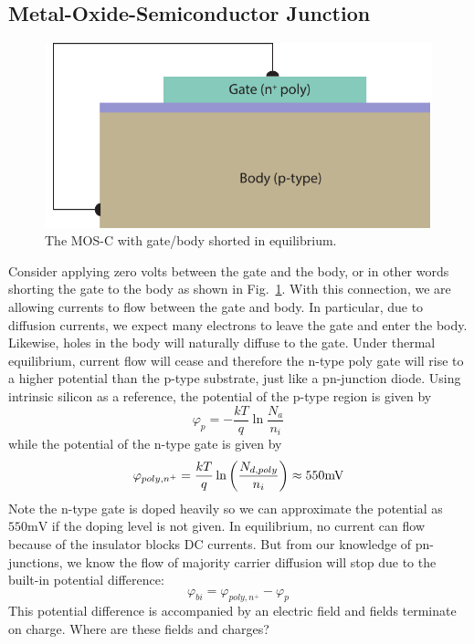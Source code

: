\subsection{Metal-Oxide-Semiconductor Junction}
\begin{figure}[tbh]
\centering
\includegraphics[width=.75\columnwidth]{mos_cap_wire_short}
\caption{The MOS-C with gate/body shorted in equilibrium. }
\label{fig:mos_cap_gate_body_short}
\end{figure}
Consider applying zero volts between the gate and the body, or in other words shorting the gate to the body as shown in Fig.~\ref{fig:mos_cap_gate_body_short}.   With this connection, we are allowing currents to flow between the gate and body.  In particular, due to diffusion currents, we expect many electrons to leave the gate and enter the body. Likewise, holes in the body will naturally diffuse to the gate.  Under thermal equilibrium, current flow will cease and therefore the n-type poly gate will rise to a higher potential than the p-type substrate, just like a pn-junction diode.  Using intrinsic silicon as a reference, the potential of the p-type region is given by
    \begin{equation}
        {\varphi _p} =  - \frac{{kT}}{q}\ln \frac{{{N_a}}}{{{n_i}}}
    \end{equation}
while the potential of the n-type gate is given by
    \begin{equation}
        {\varphi _{poly,{n^ + }}} = \frac{{kT}}{q}\ln \left( {\frac{{{N_{d,poly}}}}{{{n_i}}}} \right) 
    \approx 550{\rm{mV}}
\end{equation}
Note the n-type gate is doped heavily so we can approximate the potential as $550\mathrm{mV}$ if the doping level is not given.  In equilibrium, no current can flow because of the insulator blocks DC currents.  But from our knowledge of pn-junctions, we know the flow of majority carrier diffusion will stop due to the built-in potential difference:
    \begin{equation}
        \varphi_{bi} = {\varphi _{poly,{n^ + }}}  - {\varphi _p} 
    \end{equation}
This potential difference is accompanied by an electric field and fields terminate on charge.  Where are these fields and charges?
